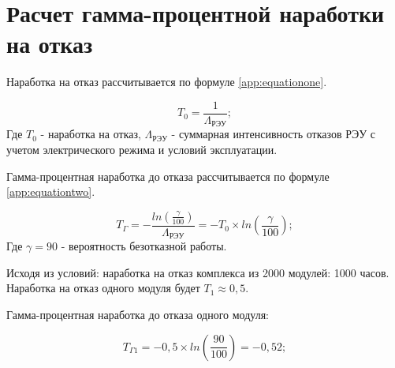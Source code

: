 \appendix
\renewcommand{\thesection}{Приложение \Asbuk{section}}
\newcommand{\appsec}{\newpage\section{}\setcounter{page}{1}\setcounter{equation}{0}}

\appsec
\section*{Расчет гамма-процентной наработки на отказ}

Наработка на отказ рассчитывается по формуле \ref{app:equationone}.

\begin{equation}\label{app:equationone}
    T_0 = \frac{1}{\Lambda_\text{РЭУ}};
\end{equation}
Где $T_0$ - наработка на отказ, $\Lambda_\text{РЭУ}$ - суммарная интенсивность отказов РЭУ с учетом электрического режима и условий эксплуатации.  

Гамма-процентная наработка до отказа рассчитывается по формуле \ref{app:equationtwo}.

\begin{equation}
\label{app:equationtwo}
T_\Gamma = - \frac{ln\left(\frac{\gamma}{100}\right)}{\Lambda_\text{РЭУ}} = -T_{0}\times ln\left(\frac{\gamma}{100}\right);
\end{equation}Где $\gamma = 90$ - вероятность безотказной работы.

Исходя из условий: наработка на отказ комплекса из 2000 модулей: 1000 часов. Наработка на отказ одного модуля будет  $T_1 \approx 0,5$.


Гамма-процентная наработка до отказа одного модуля:

\begin{equation*}
	T_{\Gamma1} = -0,5 \times ln\left(\frac{90}{100}\right) = -0,52 ;
\end{equation*}

\appsec


